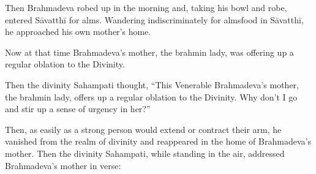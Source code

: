 \documentclass[12pt,openany]{book}%
\begin{document}
Then Brahmadeva robed up in the morning and, taking his bowl and robe, entered \textsanskrit{Sāvatthī} for alms. Wandering indiscriminately for almsfood in \textsanskrit{Sāvatthī}, he approached his own mother’s home. 

Now at that time Brahmadeva’s mother, the brahmin lady, was offering up a regular oblation to the Divinity. 

Then the divinity Sahampati thought, “This Venerable Brahmadeva’s mother, the brahmin lady, offers up a regular oblation to the Divinity. Why don’t I go and stir up a sense of urgency in her?” 

Then, as easily as a strong person would extend or contract their arm, he vanished from the realm of divinity and reappeared in the home of Brahmadeva’s mother. Then the divinity Sahampati, while standing in the air, addressed Brahmadeva’s mother in verse: 
\end{document}
